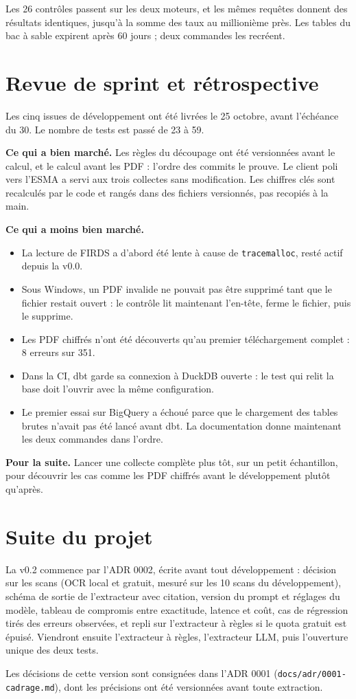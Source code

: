\documentclass[11pt,a4paper]{article}
\begin{document}
Les 26 contrôles passent sur les deux moteurs, et les mêmes requêtes donnent des résultats identiques, jusqu'à la somme des taux au millionième près. Les tables du bac à sable expirent après 60 jours ; deux commandes les recréent.

\section{Revue de sprint et rétrospective}

Les cinq issues de développement ont été livrées le 25 octobre, avant l'échéance du 30. Le nombre de tests est passé de 23 à 59.

\textbf{Ce qui a bien marché.} Les règles du découpage ont été versionnées avant le calcul, et le calcul avant les PDF : l'ordre des commits le prouve. Le client poli vers l'ESMA a servi aux trois collectes sans modification. Les chiffres clés sont recalculés par le code et rangés dans des fichiers versionnés, pas recopiés à la main.

\textbf{Ce qui a moins bien marché.}
\begin{itemize}
  \item La lecture de FIRDS a d'abord été lente à cause de \texttt{tracemalloc}, resté actif depuis la v0.0.
  \item Sous Windows, un PDF invalide ne pouvait pas être supprimé tant que le fichier restait ouvert : le contrôle lit maintenant l'en-tête, ferme le fichier, puis le supprime.
  \item Les PDF chiffrés n'ont été découverts qu'au premier téléchargement complet : 8 erreurs sur 351.
  \item Dans la CI, dbt garde sa connexion à DuckDB ouverte : le test qui relit la base doit l'ouvrir avec la même configuration.
  \item Le premier essai sur BigQuery a échoué parce que le chargement des tables brutes n'avait pas été lancé avant dbt. La documentation donne maintenant les deux commandes dans l'ordre.
\end{itemize}

\textbf{Pour la suite.} Lancer une collecte complète plus tôt, sur un petit échantillon, pour découvrir les cas comme les PDF chiffrés avant le développement plutôt qu'après.

\section{Suite du projet}

La v0.2 commence par l'ADR 0002, écrite avant tout développement : décision sur les scans (OCR local et gratuit, mesuré sur les 10 scans du développement), schéma de sortie de l'extracteur avec citation, version du prompt et réglages du modèle, tableau de compromis entre exactitude, latence et coût, cas de régression tirés des erreurs observées, et repli sur l'extracteur à règles si le quota gratuit est épuisé. Viendront ensuite l'extracteur à règles, l'extracteur LLM, puis l'ouverture unique des deux tests.

Les décisions de cette version sont consignées dans l'ADR 0001 (\texttt{docs/adr/0001-cadrage.md}), dont les précisions ont été versionnées avant toute extraction.
\end{document}
